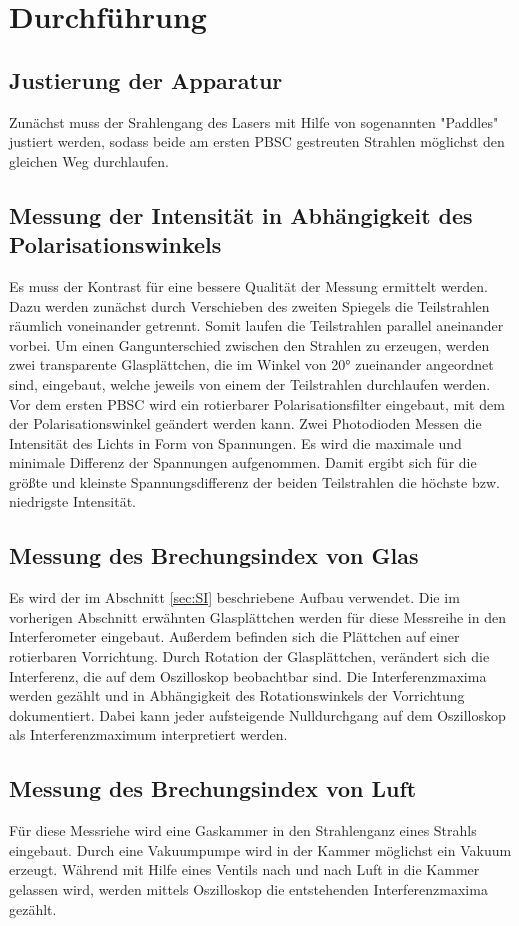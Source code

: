\section{Durchführung}
\subsection{Justierung der Apparatur}
Zunächst muss der Srahlengang des Lasers mit Hilfe von sogenannten "Paddles" justiert werden,
sodass beide am ersten PBSC gestreuten Strahlen möglichst den gleichen Weg durchlaufen.

\subsection{Messung der Intensität in Abhängigkeit des Polarisationswinkels}
Es muss der Kontrast für eine bessere Qualität der Messung ermittelt werden.
Dazu werden zunächst durch Verschieben des zweiten Spiegels die Teilstrahlen räumlich voneinander getrennt.
Somit laufen die Teilstrahlen parallel aneinander vorbei.
Um einen Gangunterschied zwischen den Strahlen zu erzeugen,
werden zwei transparente Glasplättchen,
die im Winkel von 20° zueinander angeordnet sind,
eingebaut, welche jeweils von einem der Teilstrahlen durchlaufen werden.
Vor dem ersten PBSC wird ein rotierbarer Polarisationsfilter eingebaut,
mit dem der Polarisationswinkel geändert werden kann.
Zwei Photodioden Messen die Intensität des Lichts in Form von Spannungen.
Es wird die maximale und minimale Differenz der Spannungen aufgenommen.
Damit ergibt sich für die größte und kleinste Spannungsdifferenz der beiden Teilstrahlen
die höchste bzw. niedrigste Intensität.

\subsection{Messung des Brechungsindex von Glas}
Es wird der im Abschnitt \ref{sec:SI} beschriebene Aufbau verwendet.
Die im vorherigen Abschnitt erwähnten Glasplättchen werden für diese Messreihe in den Interferometer eingebaut.
Außerdem befinden sich die Plättchen auf einer rotierbaren Vorrichtung.
Durch Rotation der Glasplättchen, verändert sich die Interferenz, die auf dem Oszilloskop beobachtbar sind.
Die Interferenzmaxima werden gezählt und in Abhängigkeit des Rotationswinkels der Vorrichtung dokumentiert.
Dabei kann jeder aufsteigende Nulldurchgang auf dem Oszilloskop als Interferenzmaximum interpretiert werden.

\subsection{Messung des Brechungsindex von Luft}
Für diese Messriehe wird eine Gaskammer in den Strahlenganz eines Strahls eingebaut.
Durch eine Vakuumpumpe wird in der Kammer möglichst ein Vakuum erzeugt.
Während mit Hilfe eines Ventils nach und nach Luft in die Kammer gelassen wird,
werden mittels Oszilloskop die entstehenden Interferenzmaxima gezählt.
